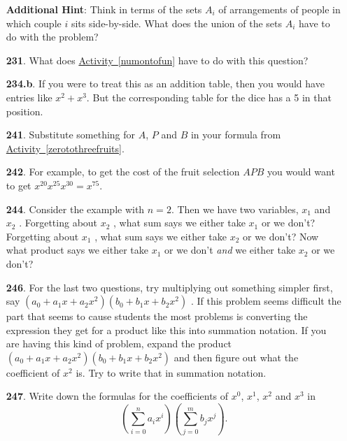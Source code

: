 \documentclass[10pt,]{book}
\theoremstyle{plain}
\theoremstyle{definition}
\theoremstyle{definition}
\theoremstyle{definition}
\numberwithin{equation}{chapter}
\begin{document}
\begin{itemize}[itemsep=1em]
\par\smallskip
\noindent\textbf{Additional Hint}: \hypertarget{p-1214}{}%
Think in terms of the sets \(A_i\) of arrangements of people in which couple \(i\) sits side-by-side. What does the union of the sets \(A_i\) have to do with the problem?%

\item[\textbf{231}.]\hypertarget{p-1229}{}%
What does \hyperref[numontofun]{Activity~\ref{numontofun}} have to do with this question?%

\item[\textbf{234.b}.]\hypertarget{p-1246}{}%
If you were to treat this as an addition table, then you would have entries like \(x^2+x^3\).  But the corresponding table for the dice has a 5 in that position.%

\item[\textbf{241}.]\hypertarget{p-1270}{}%
Substitute something for \(A\), \(P\) and \(B\) in your formula from \hyperref[zerotothreefruits]{Activity~\ref{zerotothreefruits}}.%

\item[\textbf{242}.]\hypertarget{p-1273}{}%
For example, to get the cost of the fruit selection \(AP B\) you would want to get \(x^{20} x^{25} x^{30} = x^{75}\).%

\item[\textbf{244}.]\hypertarget{p-1278}{}%
Consider the example with \(n = 2\). Then we have two variables, \(x_1\) and \(x_2\) .  Forgetting about \(x_2\) , what sum says we either take \(x_1\) or we don't? Forgetting about \(x_1\) , what sum says we either take \(x_2\) or we don't? Now what product says we either take \(x_1\) or we don't \emph{and} we either take \(x_2\) or we don't?%

\item[\textbf{246}.]\hypertarget{p-1287}{}%
For the last two questions, try multiplying out something simpler first, say \((a_0 + a_1 x + a_2 x^2 )(b_0 + b_1 x + b_2 x^2 )\) . If this problem seems difficult the part that seems to cause students the most problems is converting the expression they get for a product like this into summation notation. If you are having this kind of problem, expand the product \((a_0 + a_1 x + a_2 x^2 )(b_0 + b_1 x + b_2 x^2 )\) and then figure out what the coefficient of \(x^2\) is. Try to write that in summation notation.%

\item[\textbf{247}.]\hypertarget{p-1291}{}%
Write down the formulas for the coefficients of \(x^0\), \(x^1\), \(x^2\) and \(x^3\) in%
\begin{equation*}
\left(\sum_{i=0}^n a_ix^i\right)\left(\sum_{j=0}^m b_jx^j\right)\text{.}
\end{equation*}
%


\end{itemize}
\end{document}
